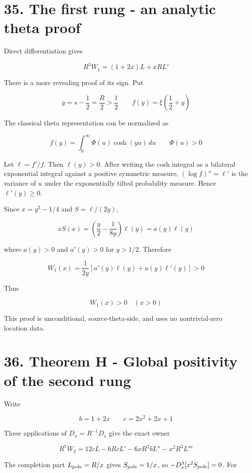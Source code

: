 \documentclass[
  11pt,
]{book}
\begin{document}
\section{35. The first rung - an analytic theta
proof}\label{the-first-rung---an-analytic-theta-proof}

Direct differentiation gives

\[
\boxed{R^3W_1=(1+2x)L+xRL'}
\tag{35.1}
\]

There is a more revealing proof of its sign. Put

\[
y=s-\frac12=\frac R2>\frac12
\qquad
f(y)=\xi\!\left(\frac12+y\right)
\]

The classical theta representation can be normalized as

\[
f(y)=\int_0^\infty\Phi(u)\cosh(yu)\,du
\qquad
\Phi(u)>0
\]

Let \(\ell=f'/f\). Then \(\ell(y)>0\). After writing the cosh integral
as a bilateral exponential integral against a positive symmetric
measure, \((\log f)''=\ell'\) is the variance of \(u\) under the
exponentially tilted probability measure. Hence \(\ell'(y)\ge0\).

Since \(x=y^2-1/4\) and \(S=\ell/(2y)\),

\[
xS(x)=\left(\frac y2-\frac1{8y}\right)\ell(y)=a(y)\ell(y)
\]

where \(a(y)>0\) and \(a'(y)>0\) for \(y>1/2\). Therefore

\[
W_1(x)=\frac1{2y}\left[a'(y)\ell(y)+a(y)\ell'(y)\right]>0
\]

Thus

\[
\boxed{W_1(x)>0\quad(x>0)}
\tag{35.2}
\]

This proof is unconditional, source-theta-side, and uses no
nontrivial-zero location data.

\section{36. Theorem H - Global positivity of the second
rung}\label{theorem-h---global-positivity-of-the-second-rung}

Write

\[
b=1+2x
\qquad
c=2x^2+2x+1
\]

Three applications of \(D_x=R^{-1}D_s\) give the exact owner

\[
\boxed{
R^7W_2
=12cL-6RcL'-6xR^2bL''-x^2R^3L'''
}
\tag{36.1}
\]

The completion part \(L_{\rm pole}=R/x\) gives \(S_{\rm pole}=1/x\), so
\(-D_x^3[x^2S_{\rm pole}]=0\). For
\end{document}
